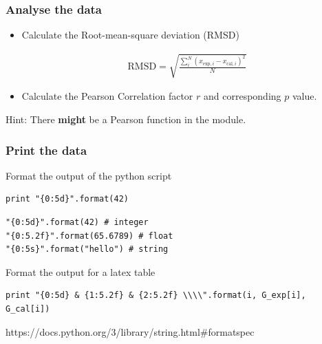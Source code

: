 \begin{frame}[fragile]

    \frametitle{Analyse the data}

    \begin{itemize}
        \item Calculate the Root-mean-square deviation (RMSD)

        \begin{align*}
            \mathrm{RMSD} = \sqrt{\frac{\sum_i^N (x_{\mathrm{exp},i}-x_{\mathrm{cal},i})^2 }{N}}
        \end{align*}

    \end{itemize}

    \begin{itemize}
        \item Calculate the Pearson Correlation factor $r$ and corresponding $p$ value.
    \end{itemize}

    \bigskip

    Hint: There {\bf might} be a Pearson function in the  module.

\end{frame}


\begin{frame}[fragile]

    \frametitle{Print the data}

    Format the output of the python script

\begin{lstlisting}
print "{0:5d}".format(42)
\end{lstlisting}

\smallskip

\begin{lstlisting}
"{0:5d}".format(42) # integer
"{0:5.2f}".format(65.6789) # float
"{0:5s}".format("hello") # string
\end{lstlisting}

\bigskip

Format the output for a latex table

\smallskip

\begin{lstlisting}
print "{0:5d} & {1:5.2f} & {2:5.2f} \\\\".format(i, G_exp[i], G_cal[i])
\end{lstlisting}

\bigskip

https://docs.python.org/3/library/string.html\#formatspec

\end{frame}


